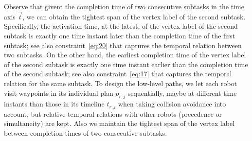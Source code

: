 \documentclass[journal]{IEEEtran}
\begin{document}
{ %

 {Observe that givent the completion time of two consecutive subtasks in the time axis $\vec{t}$, we can obtain the tightest span of the vertex label of the second subtask. Specifically, the activation time, at the latest, of the vertex label of the second subtask is exactly one time instant later than the completion time of the first subtask; see also constraint~\eqref{eq:20} that captures the temporal relation between two subtasks. On the other hand, the earliest completion time of the vertex label of the second subtask is exactly one time instant earlier than the completion time of the second subtask; see also constraint~\eqref{eq:17} that captures the temporal relation for the same subtask.  To design the low-level paths,  we let each robot visit waypoints in its individual plan $p_{r,j}$ sequentially, maybe at different time instants than those in its timeline $t_{r,j}$ when taking collision avoidance into account, but relative temporal relations with other robots (precedence or simultaneity) are kept. Also we maintain the tightest span of the vertex label between completion times of two consecutive subtasks.}

}
\end{document}
